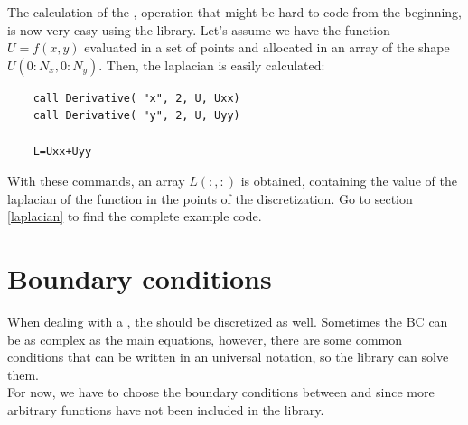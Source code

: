 The calculation of the , operation that might be hard to code from
the beginning, is now very easy using the library. Let's assume we have the
function $U=f(x,y)$ evaluated in a set of points and allocated in an
array of the shape $U(0:N_x, 0:N_y)$. Then, the laplacian is easily
calculated: \\



\begin{blueframed}
\begin{lstlisting}
	call Derivative( "x", 2, U, Uxx) 
	call Derivative( "y", 2, U, Uyy) 

	L=Uxx+Uyy
\end{lstlisting}
\end{blueframed}

With these commands, an array $L(:,:)$ is obtained, containing the value of the
laplacian of the function in the points of the discretization. Go to section
\ref{laplacian} to find the complete example code.\\


\section{Boundary conditions}

When dealing with a , the  should
be discretized as well. Sometimes the BC can be as complex as the main equations, however,
there are some common conditions that can be written in an universal notation,
so the library can solve them. \\

For now, we have to choose the boundary conditions between  and
 since more arbitrary functions have not been included in the
library. \\



